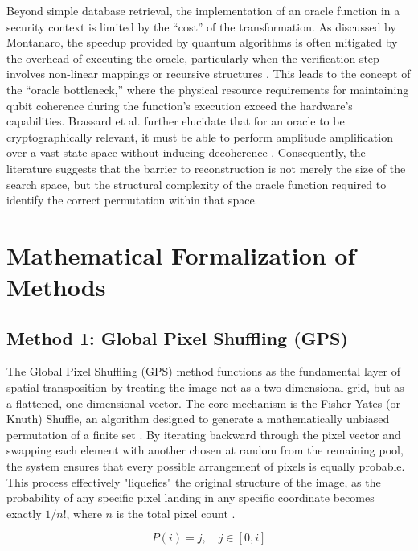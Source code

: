 \documentclass[12pt,fleqn]{article}
\begin{document}
Beyond simple database retrieval, the implementation of an oracle function in a security context is limited by the ``cost'' of the transformation. As discussed by Montanaro, the speedup provided by quantum algorithms is often mitigated by the overhead of executing the oracle, particularly when the verification step involves non-linear mappings or recursive structures \cite{montanaro2016quantum}. This leads to the concept of the ``oracle bottleneck,'' where the physical resource requirements for maintaining qubit coherence during the function's execution exceed the hardware's capabilities. Brassard et al. further elucidate that for an oracle to be cryptographically relevant, it must be able to perform amplitude amplification over a vast state space without inducing decoherence \cite{brassard2002quantum}. Consequently, the literature suggests that the barrier to reconstruction is not merely the size of the search space, but the structural complexity of the oracle function required to identify the correct permutation within that space.

\section{Mathematical Formalization of Methods}

\subsection{Method 1: Global Pixel Shuffling (GPS)}
The Global Pixel Shuffling (GPS) method functions as the fundamental layer of spatial transposition by treating the image not as a two-dimensional grid, but as a flattened, one-dimensional vector. The core mechanism is the Fisher-Yates (or Knuth) Shuffle, an algorithm designed to generate a mathematically unbiased permutation of a finite set \cite{knuth1997art}. By iterating backward through the pixel vector and swapping each element with another chosen at random from the remaining pool, the system ensures that every possible arrangement of pixels is equally probable. This process effectively "liquefies" the original structure of the image, as the probability of any specific pixel landing in any specific coordinate becomes exactly $1/n!$, where $n$ is the total pixel count \cite{fisher1938statistical}.

\begin{equation} \label{eq:gps_selection_logic}
P(i) = j, \quad j \in [0,i]
\end{equation}
\end{document}
